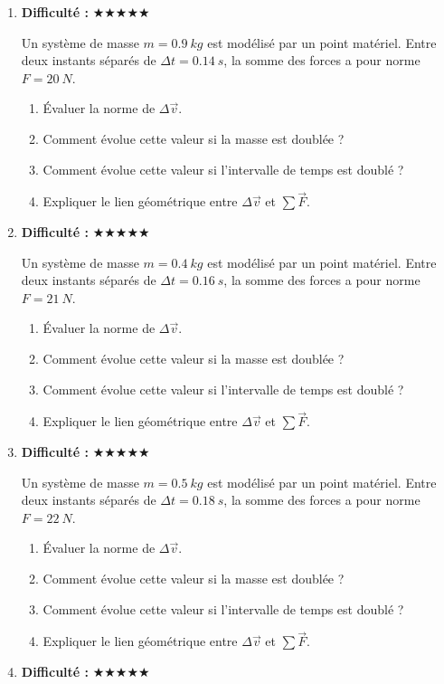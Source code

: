 \documentclass[11pt,a4paper]{article}
\newcommand{\etoiles}[1]{\textbf{Difficulté : }#1}
\begin{document}
\begin{enumerate}[label=\textbf{Exercice \arabic*.},leftmargin=*]
Un système de masse $m=0.8\ \si{kg}$ est modélisé par un point matériel.
Entre deux instants séparés de $\Delta t=0.12\ \si{s}$, la somme des forces a pour norme $F=19\ \si{N}$.
\begin{enumerate}[label=\alph*)]
\item Évaluer la norme de $\Delta \vec v$.
\item Comment évolue cette valeur si la masse est doublée ?
\item Comment évolue cette valeur si l'intervalle de temps est doublé ?
\item Expliquer le lien géométrique entre $\Delta\vec v$ et $\sum \vec F$.
\end{enumerate}
\item \etoiles{★★★★★}

Un système de masse $m=0.9\ \si{kg}$ est modélisé par un point matériel.
Entre deux instants séparés de $\Delta t=0.14\ \si{s}$, la somme des forces a pour norme $F=20\ \si{N}$.
\begin{enumerate}[label=\alph*)]
\item Évaluer la norme de $\Delta \vec v$.
\item Comment évolue cette valeur si la masse est doublée ?
\item Comment évolue cette valeur si l'intervalle de temps est doublé ?
\item Expliquer le lien géométrique entre $\Delta\vec v$ et $\sum \vec F$.
\end{enumerate}
\item \etoiles{★★★★★}

Un système de masse $m=0.4\ \si{kg}$ est modélisé par un point matériel.
Entre deux instants séparés de $\Delta t=0.16\ \si{s}$, la somme des forces a pour norme $F=21\ \si{N}$.
\begin{enumerate}[label=\alph*)]
\item Évaluer la norme de $\Delta \vec v$.
\item Comment évolue cette valeur si la masse est doublée ?
\item Comment évolue cette valeur si l'intervalle de temps est doublé ?
\item Expliquer le lien géométrique entre $\Delta\vec v$ et $\sum \vec F$.
\end{enumerate}
\item \etoiles{★★★★★}

Un système de masse $m=0.5\ \si{kg}$ est modélisé par un point matériel.
Entre deux instants séparés de $\Delta t=0.18\ \si{s}$, la somme des forces a pour norme $F=22\ \si{N}$.
\begin{enumerate}[label=\alph*)]
\item Évaluer la norme de $\Delta \vec v$.
\item Comment évolue cette valeur si la masse est doublée ?
\item Comment évolue cette valeur si l'intervalle de temps est doublé ?
\item Expliquer le lien géométrique entre $\Delta\vec v$ et $\sum \vec F$.
\end{enumerate}
\item \etoiles{★★★★★}


\end{enumerate}
\end{document}
